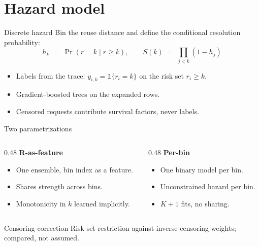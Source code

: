 \section{Hazard model}

\begin{frame}{Discrete hazard}
  Bin the reuse distance and define the conditional resolution probability:
  \begin{equation*}
    h_k \;=\; \Pr(r = k \mid r \ge k),
    \qquad
    S(k) \;=\; \prod_{j<k}(1 - h_j)
  \end{equation*}
  \begin{itemize}
    \item Labels from the trace: $y_{i,k} = \mathbb{1}\{r_i = k\}$ on the risk set $r_i \ge k$.
    \item Gradient-boosted trees on the expanded rows.
    \item Censored requests contribute survival factors, never labels.
  \end{itemize}
\end{frame}

\begin{frame}{Two parametrizations}
  \begin{columns}[T,onlytextwidth]
    \begin{column}{0.48\textwidth}
      \textbf{R-as-feature}
      \begin{itemize}
        \item One ensemble, bin index as a feature.
        \item Shares strength across bins.
        \item Monotonicity in $k$ learned implicitly.
      \end{itemize}
    \end{column}
    \begin{column}{0.48\textwidth}
      \textbf{Per-bin}
      \begin{itemize}
        \item One binary model per bin.
        \item Unconstrained hazard per bin.
        \item $K+1$ fits, no sharing.
      \end{itemize}
    \end{column}
  \end{columns}
  \vspace{1em}
  \begin{block}{Censoring correction}
    Risk-set restriction against inverse-censoring weights; compared, not assumed.
  \end{block}
\end{frame}
